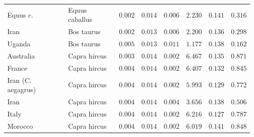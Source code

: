 \documentclass[12pt]{article}
\begin{document}
\begin{center}
\begin{longtable*}{|l|l|r|r|r|r|r|r|}
            \bottomrule
            \endlastfoot
             Equus c. &      Equus caballus &               $ 0.002$ &              $ 0.014$ &              $ 0.006$ &                                          $ 2.230$ &                         $ 0.141$ &                      $ 0.316$ \\
            Iran &          Bos taurus &               $ 0.002$ &              $ 0.013$ &              $ 0.006$ &                                          $ 2.200$ &                         $ 0.136$ &                      $ 0.298$ \\
            Uganda &          Bos taurus &               $ 0.005$ &              $ 0.013$ &              $ 0.011$ &                                          $ 1.177$ &                         $ 0.138$ &                      $ 0.162$ \\
             Australia &        Capra hircus &               $ 0.003$ &              $ 0.014$ &              $ 0.002$ &                                          $ 6.467$ &                         $ 0.135$ &                      $ 0.871$ \\
             France &        Capra hircus &               $ 0.004$ &              $ 0.014$ &              $ 0.002$ &                                          $ 6.407$ &                         $ 0.132$ &                      $ 0.845$ \\
             Iran (C. aegagrus) &        Capra hircus &               $ 0.004$ &              $ 0.014$ &              $ 0.002$ &                                          $ 5.993$ &                         $ 0.129$ &                      $ 0.772$ \\
             Iran &        Capra hircus &               $ 0.004$ &              $ 0.014$ &              $ 0.004$ &                                          $ 3.656$ &                         $ 0.138$ &                      $ 0.506$ \\
             Italy &        Capra hircus &               $ 0.004$ &              $ 0.014$ &              $ 0.002$ &                                          $ 6.216$ &                         $ 0.127$ &                      $ 0.787$ \\
             Morocco &        Capra hircus &               $ 0.004$ &              $ 0.014$ &              $ 0.002$ &                                          $ 6.019$ &                         $ 0.141$ &                      $ 0.848$ \\

\end{longtable*}
\end{center}
\end{document}
